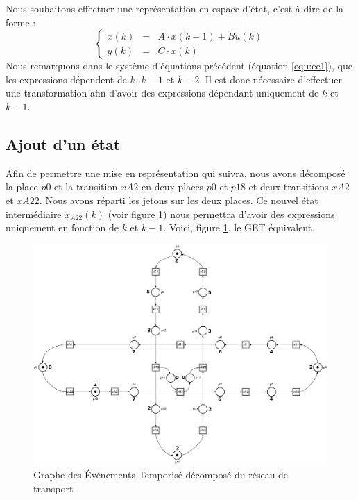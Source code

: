 Nous souhaitons effectuer une représentation en espace d'état, c'est-à-dire de la forme :
\begin{equation}
\label{equ:eeRef}
\left\lbrace\begin{array}{lcl}
	x(k) &=& A \cdot x(k-1) + B u(k)\\
	y(k) &=& C \cdot x(k)
\end{array}\right.
\end{equation}
Nous remarquons dans le système d'équations précédent (équation \ref{equ:ee1}), que les expressions dépendent de $k$, $k-1$ et $k-2$. Il est donc nécessaire d'effectuer une transformation afin d'avoir des expressions dépendant uniquement de $k$ et $k-1$.
\subsection{Ajout d'un état}
Afin de permettre une mise en représentation qui suivra, nous avons décomposé la place $p0$ et la transition $xA2$ en deux places $p0$ et $p18$ et deux transitions $xA2$ et $xA22$. Nous avons réparti les jetons sur les deux places. Ce nouvel état intermédiaire $x_{A22}(k)$ (voir figure \ref{fig:get_train_decompo}) nous permettra d'avoir des expressions uniquement en fonction de $k$ et $k-1$.
Voici, figure \ref{fig:get_train_decompo}, le GET équivalent.


\begin{figure}[!ht]
\centering
\includegraphics[width = .8\textwidth]{./I/images/train_decompose.pdf}
\caption{\label{fig:get_train_decompo} Graphe des Événements Temporisé décomposé du réseau de transport }
\end{figure}

